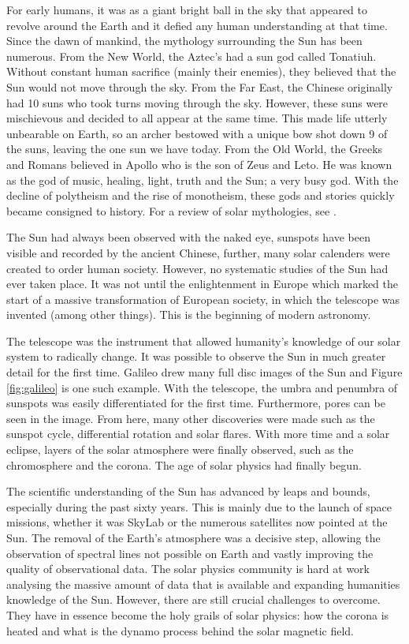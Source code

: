     For early humans, it was as a giant bright ball in the sky that appeared to revolve around the Earth and it defied any human understanding at that time.
    Since the dawn of mankind, the mythology surrounding the Sun has been numerous.    
    From the New World, the Aztec's had a sun god called Tonatiuh. 
    Without constant human sacrifice (mainly their enemies), they believed that the Sun would not move through the sky.
    From the Far East, the Chinese originally had 10 suns who took turns moving through the sky. 
    However, these suns were mischievous and decided to all appear at the same time. 
    This made life utterly unbearable on Earth, so an archer bestowed with a unique bow shot down 9 of the suns, leaving the one sun we have today.
    From the Old World, the Greeks and Romans believed in Apollo who is the son of Zeus and Leto.
    He was known as the god of music, healing, light, truth and the Sun; a very busy god.
    With the decline of polytheism and the rise of monotheism, these gods and stories quickly became consigned to history. 
    For a review of solar mythologies, see \citet{mythbook}.
    
    The Sun had always been observed with the naked eye, sunspots have been visible and recorded by the ancient Chinese, further, many solar calenders were created to order human society.
    However, no systematic studies of the Sun had ever taken place.
    It was not until the enlightenment in Europe which marked the start of a massive transformation of European society, in which the telescope was invented (among other things).
    This is the beginning of modern astronomy.
    
    The telescope was the instrument that allowed humanity's knowledge of our solar system to radically change.
    It was possible to observe the Sun in much greater detail for the first time.
    Galileo drew many full disc images of the Sun and Figure \ref{fig:galileo} is one such example. 
    With the telescope, the umbra and penumbra of sunspots was easily differentiated for the first time.
    Furthermore, pores can be seen in the image.
    From here, many other discoveries were made such as the sunspot cycle, differential rotation and solar flares.
    With more time and a solar eclipse, layers of the solar atmosphere were finally observed, such as the chromosphere and the corona.
    The age of solar physics had finally begun.
    
    The scientific understanding of the Sun has advanced by leaps and bounds, especially during the past sixty years.
    This is mainly due to the launch of space missions, whether it was SkyLab or the numerous satellites now pointed at the Sun.
    The removal of the Earth's atmosphere was a decisive step, allowing the observation of spectral lines not possible on Earth and vastly improving the quality of observational data.
    The solar physics community is hard at work analysing the massive amount of data that is available and expanding humanities knowledge of the Sun.   
    However, there are still crucial challenges to overcome.
    They have in essence become the holy grails of solar physics: how the corona is heated and what is the dynamo process behind the solar magnetic field.

